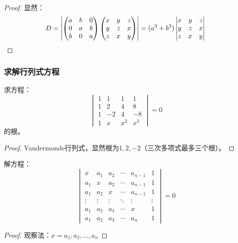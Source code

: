 \begin{proof}
	显然：
	\begin{equation*}
		D=\left|
		\begin{pmatrix}
			a & b & 0 \\
			0 & a & b \\
			b & 0 & a
		\end{pmatrix}
		\begin{pmatrix}
			x & y & z \\
			y & z & x \\
			z & x & y
		\end{pmatrix}
		\right|
		=(a^3+b^3)
		\begin{vmatrix}
			x & y & z \\
			y & z & x \\
			z & x & y
		\end{vmatrix}\qedhere
	\end{equation*}
\end{proof}

\subsubsection{求解行列式方程}
\begin{theorem}
	求方程：
	\begin{equation*}
		\begin{vmatrix}
			1 & 1 & 1 & 1 \\
			1 & 2 & 4 & 8 \\
			1 & -2 & 4 & -8 \\
			1 & x & x^2 & x^3
		\end{vmatrix}=0
	\end{equation*}
	的根。
\end{theorem}
\begin{proof}
	Vandermonde行列式，显然根为$1,2,-2$（三次多项式最多三个根）。
\end{proof}
\begin{theorem}
	解方程：
	\begin{equation*}
		\begin{vmatrix}
			x & a_1 & a_2 & \cdots & a_{n-1} & 1 \\
			a_1 & x & a_2 & \cdots & a_{n-1} & 1 \\
			a_1 & a_2 & x & \cdots & a_{n-1} & 1 \\
			\vdots & \vdots & \vdots & \ddots & \vdots & \vdots \\
			a_1 & a_2 & a_3 & \cdots & x & 1 \\
			a_1 & a_2 & a_3 & \cdots & a_n & 1
		\end{vmatrix}=0
	\end{equation*}
\end{theorem}
\begin{proof}
	观察法：$x=a_1,a_2,\dots,a_n$
\end{proof}